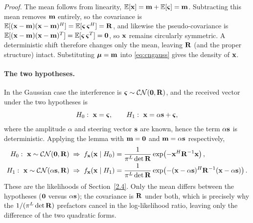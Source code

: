 \documentclass{article}
\begin{document}
\emph{Proof.} The mean follows from linearity, $\mathbb{E}[\vb x]=\vb m+\mathbb{E}[\boldsymbol{\varsigma}]=\vb m$. Subtracting this mean removes $\vb m$ entirely, so the covariance is $\mathbb{E}[(\vb x-\vb m)(\vb x-\vb m)^H]=\mathbb{E}[\boldsymbol{\varsigma}\,\boldsymbol{\varsigma}^H]=\mathbf{R}$, and likewise the pseudo-covariance is $\mathbb{E}[(\vb x-\vb m)(\vb x-\vb m)^T]=\mathbb{E}[\boldsymbol{\varsigma}\,\boldsymbol{\varsigma}^T]=\mathbf{0}$, so $\vb x$ remains circularly symmetric. A deterministic shift therefore changes only the mean, leaving $\mathbf{R}$ (and the proper structure) intact. Substituting $\boldsymbol{\mu}=\vb m$ into \eqref{eq:cngauss} gives the density of $\vb x$.

\paragraph{The two hypotheses.}
In the Gaussian case the interference is $\boldsymbol{\varsigma}\sim\mathcal{CN}(\vb 0,\mathbf{R})$,
and the received vector under the two hypotheses is
$$H_0:\ \vb x=\boldsymbol{\varsigma}, \qquad H_1:\ \vb x=\alpha\vb s+\boldsymbol{\varsigma},$$
where the amplitude $\alpha$ and steering vector $\vb s$ are known, hence the term
$\alpha\vb s$ is deterministic. Applying the lemma with $\vb m=\vb 0$ and
$\vb m=\alpha\vb s$ respectively,
\begin{align}
  H_0:\ \vb x\sim\mathcal{CN}(\vb 0,\mathbf{R})
     &\;\Rightarrow\;
     f_{\vb x}(\vb x\mid H_0)=\frac{1}{\pi^L\det\mathbf{R}}
        \exp\!\left(-\vb x^H\mathbf{R}^{-1}\vb x\right), \nonumber\\
  H_1:\ \vb x\sim\mathcal{CN}(\alpha\vb s,\mathbf{R})
     &\;\Rightarrow\;
     f_{\vb x}(\vb x\mid H_1)=\frac{1}{\pi^L\det\mathbf{R}}
        \exp\!\left(-(\vb x-\alpha\vb s)^H\mathbf{R}^{-1}(\vb x-\alpha\vb s)\right). \nonumber
\end{align}
These are the likelihoods of Section~\ref{2.4}. Only the mean differs between the hypotheses ($\vb 0$ versus $\alpha\vb s$); the covariance is $\mathbf{R}$ under both, which is precisely why the $1/(\pi^L\det\mathbf{R})$ prefactors cancel in the log-likelihood ratio, leaving only the difference of the two quadratic forms.
\end{document}
